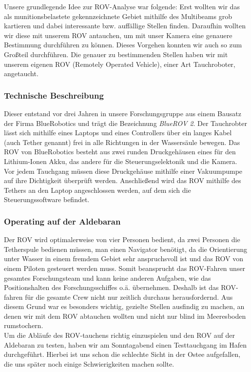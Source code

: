 
Unsere grundlegende Idee zur ROV-Analyse war folgende: Erst wollten wir das als munitionsbelastete gekennzeichnete Gebiet mithilfe 
des Multibeams grob kartieren und dabei 
interessante bzw. auffällige Stellen finden. Daraufhin wollten wir diese mit unserem ROV antauchen, um mit unser Kamera eine genauere Bestimmung durchführen zu können. 
Dieses Vorgehen konnten wir auch so zum Großteil durchführen.
Die genauer zu bestimmenden Stellen haben wir mit unserem eigenen ROV (Remotely Operated Vehicle), einer Art Tauchroboter, angetaucht. 
\subsubsection{Technische Beschreibung}
Dieser entstand vor drei Jahren in unsere Forschungsgruppe aus einem Bausatz der Firma BlueRobotics und trägt die Bezeichnung \emph{BlueROV 2}.
Der Tauchrobter lässt sich mithilfe eines Laptops und eines Controllers über ein langes Kabel (auch Tether genannt) frei in alle Richtungen in der Wassersäule bewegen.
Das ROV von BlueRobotics besteht aus zwei runden Druckgehäusen eines für den Lithium-Ionen Akku, das andere für die Steuerungselektonik und die Kamera.
Vor jedem Tauchgang müssen diese Druckgehäuse mithilfe einer Vakuumpumpe auf ihre Dichtigkeit überprüft werden. 
Anschließend wird das ROV mithilfe des Tethers an den Laptop angeschlossen werden, auf dem sich die Steuerungssoftware befindet.
\subsubsection{Operating auf der Aldebaran}
Der ROV wird optimalerweise 
von vier Personen bedient, da zwei Personen die Tetherspule bedienen müssen, man einen Navigator benötigt, da die Orientierung unter Wasser in einem fremdem Gebiet sehr anspruchsvoll ist und das ROV von einem Piloten gesteuert werden muss.
Somit beansprucht das ROV-Fahren unser gesamtes Forschungsteam und kann keine anderen Aufgaben, wie das Positionshalten des Forschungsschiffes o.ä. übernehmen. Deshalb ist das ROV-fahren für die gesamte Crew nicht nur zeitlich durchaus herausfordernd.
Aus diesem Grund war es besonders wichtig, gezielte Stellen ausfindig zu machen, an denen wir mit dem ROV abtauchen wollten und nicht nur blind im Meeresboden rumstochern.
\\

Um die Abläufe des ROV-tauchens richtig einzuspielen und den ROV auf der Aldebaran zu testen, haben wir am Sonntagabend einen Testtauchgang im Hafen durchgeführt. 
Hierbei ist uns schon die schlechte Sicht in der Ostee aufgefallen, die uns später noch einige Schwierigkeiten machen sollte.
\\

